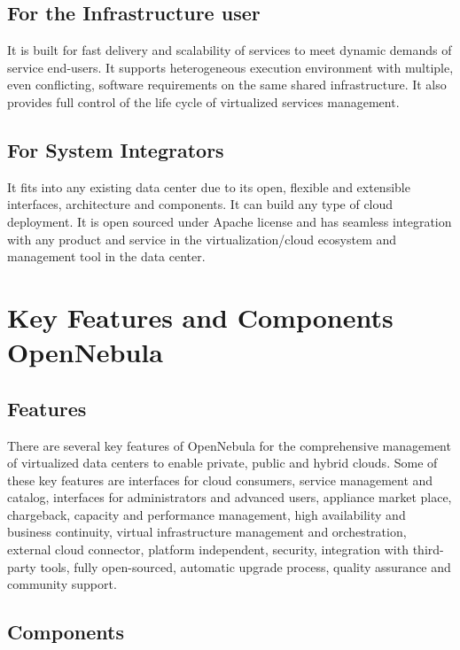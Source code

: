 \documentclass[9pt,twocolumn,twoside]{styles/osajnl}
\begin{document}
\subsection{For the Infrastructure user}

It is built for fast delivery and scalability of services to meet 
dynamic demands of service end-users. It supports heterogeneous 
execution environment with multiple, even conflicting, software 
requirements on the same shared infrastructure. It also provides full 
control of the life cycle of virtualized services management.

\subsection{For System Integrators}

It fits into any existing data center due to its open, flexible and 
extensible interfaces, architecture and components. It can build any 
type of cloud deployment. It is open sourced under Apache license and 
has seamless integration with any product and service in the 
virtualization/cloud ecosystem and management tool in the data 
center.

\section{Key Features and Components OpenNebula}

\subsection{Features}
There are several key {features of 
OpenNebula}\cite{www-features-opennebula} for the comprehensive 
management of virtualized data centers to enable private, public and 
hybrid clouds. Some of these key features are interfaces for cloud 
consumers, service management and catalog, interfaces for 
administrators and advanced users, appliance market place, 
chargeback, capacity and performance management, high availability 
and business continuity, virtual infrastructure management and 
orchestration, external cloud connector, platform independent, 
security, integration with third-party tools, fully open-sourced, 
automatic upgrade process, quality assurance and community support.

\subsection{Components}
\end{document}

